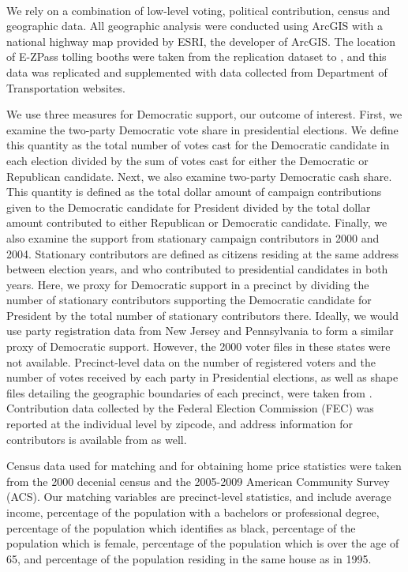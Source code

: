 \\ 
\indent We rely on a combination of low-level voting, political contribution, census and geographic data. All geographic analysis were conducted using ArcGIS with a national highway map provided by ESRI, the developer of ArcGIS. The location of E-ZPass tolling booths were taken from the replication dataset to \textcite{Currie2011a}, and this data was replicated and supplemented with data collected from Department of Transportation websites. 

We use three measures for Democratic support, our outcome of interest. First, we examine the two-party Democratic vote share in presidential elections. We define this quantity as the total number of votes cast for the Democratic candidate in each election divided by the sum of votes cast for either the Democratic or Republican candidate. Next, we also examine two-party Democratic cash share. This quantity is defined as the total dollar amount of campaign contributions given to the Democratic candidate for President divided by the total dollar amount contributed to either Republican or Democratic candidate. Finally, we also examine the support from stationary campaign contributors in 2000 and 2004. Stationary contributors are defined as citizens residing at the same address between election years, and who contributed to presidential candidates in both years. Here, we proxy for Democratic support in a precinct by dividing the number of stationary contributors supporting the Democratic candidate for President by the total number of stationary contributors there. Ideally, we would use party registration data from New Jersey and Pennsylvania to form a similar proxy of Democratic support. However, the 2000 voter files in these states were not available. Precinct-level data on the number of registered voters and the number of votes received by each party in Presidential elections, as well as shape files detailing the geographic boundaries of each precinct, were taken from \textcite{Ansolabehere2014}. Contribution data collected by the Federal Election Commission (FEC) was reported at the individual level by zipcode, and address information for contributors is available from \textcite{Bonica2013} as well. 

Census data used for matching and for obtaining home price statistics were taken from the 2000 decenial census and the 2005-2009 American Community Survey (ACS). Our matching variables are precinct-level statistics, and include average income, percentage of the population with a bachelors or professional degree, percentage of the population which identifies as black, percentage of the population which is female, percentage of the population which is over the age of 65, and percentage of the population residing in the same house as in 1995. 

